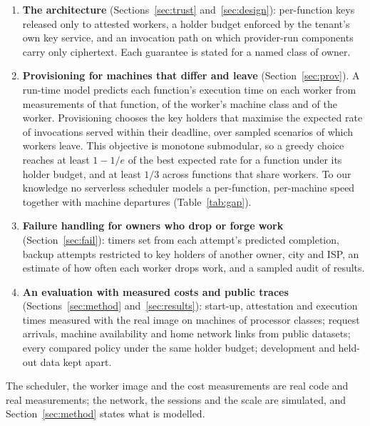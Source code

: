 \begin{enumerate}
\item \textbf{The architecture} (Sections~\ref{sec:trust} and~\ref{sec:design}): per-function keys released only to
  attested workers, a holder budget enforced by the tenant's own key service, and an invocation path on which
  provider-run components carry only ciphertext. Each guarantee is stated for a named class of owner.
\item \textbf{Provisioning for machines that differ and leave} (Section~\ref{sec:prov}). A run-time model predicts
  each function's execution time on each worker from measurements of that function, of the worker's machine class and
  of the worker. Provisioning chooses the key holders that maximise the expected rate of invocations served within
  their deadline, over sampled scenarios of which workers leave. This objective is monotone submodular, so a greedy
  choice reaches at least $1-1/e$ of the best expected rate for a function under its holder budget, and at least
  $1/3$ across functions that share workers. To our knowledge no serverless scheduler models a per-function,
  per-machine speed together with machine departures (Table~\ref{tab:gap}).
\item \textbf{Failure handling for owners who drop or forge work} (Section~\ref{sec:fail}): timers set from each
  attempt's predicted completion, backup attempts restricted to key holders of another owner, city and ISP, an
  estimate of how often each worker drops work, and a sampled audit of results.
\item \textbf{An evaluation with measured costs and public traces} (Sections~\ref{sec:method}
  and~\ref{sec:results}): start-up, attestation and execution times measured with the real image on \VMachCount{}
  machines of \VMachProcClasses{} processor classes; request arrivals, machine availability and home network links
  from public datasets; every compared policy under the same holder budget; development and held-out data kept apart.
\end{enumerate}

The scheduler, the worker image and the cost measurements are real code and real measurements; the network, the
sessions and the scale are simulated, and Section~\ref{sec:method} states what is modelled.
